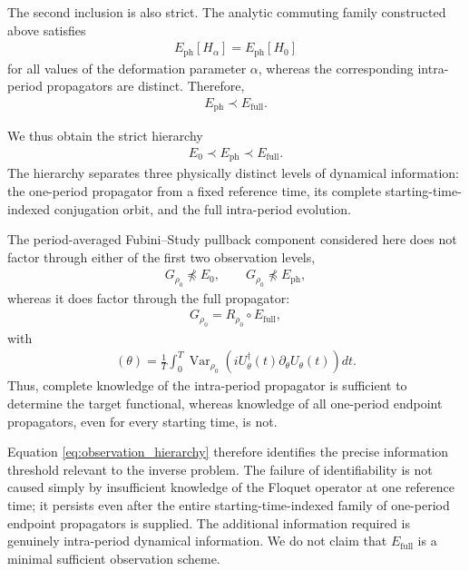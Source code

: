 \documentclass[twocolumn,prl,aps,floatfix]{revtex4-2}
\begin{document}
The second inclusion is also strict. The analytic commuting family constructed above satisfies
\begin{align}
E_{\mathrm{ph}}[H_\alpha]=E_{\mathrm{ph}}[H_0]
\end{align}
for all values of the deformation parameter $\alpha$, whereas the corresponding intra-period propagators are distinct. Therefore,
\begin{align}
E_{\mathrm{ph}}\prec E_{\mathrm{full}}.
\end{align}

We thus obtain the strict hierarchy
\begin{align}
\boxed{
E_0\prec E_{\mathrm{ph}}\prec E_{\mathrm{full}}.
}
\label{eq:observation_hierarchy}
\end{align}
The hierarchy separates three physically distinct levels of dynamical information: the one-period propagator from a fixed reference time, its complete starting-time-indexed conjugation orbit, and the full intra-period evolution.

The period-averaged Fubini--Study pullback component considered here does not factor through either of the first two observation levels,
\begin{align}
G_{\rho_0}\not\preceq E_0,
\qquad
G_{\rho_0}\not\preceq E_{\mathrm{ph}},
\end{align}
whereas it does factor through the full propagator:
\begin{align}
G_{\rho_0}
=
R_{\rho_0}\circ E_{\mathrm{full}},
\end{align}
with
\begin{align}
[R_{\rho_0}(U)](\theta)
=
\frac{1}{T}
\int_0^T
\operatorname{Var}_{\rho_0}
\!\left(
iU_\theta^\dagger(t)\partial_\theta U_\theta(t)
\right)dt .
\label{eq:G_factor_full}
\end{align}
Thus, complete knowledge of the intra-period propagator is sufficient to determine the target functional, whereas knowledge of all one-period endpoint propagators, even for every starting time, is not.

Equation \eqref{eq:observation_hierarchy} therefore identifies the precise information threshold relevant to the inverse problem. The failure of identifiability is not caused simply by insufficient knowledge of the Floquet operator at one reference time; it persists even after the entire starting-time-indexed family of one-period endpoint propagators is supplied. The additional information required is genuinely intra-period dynamical information. We do not claim that $E_{\mathrm{full}}$ is a minimal sufficient observation scheme.
\end{document}
